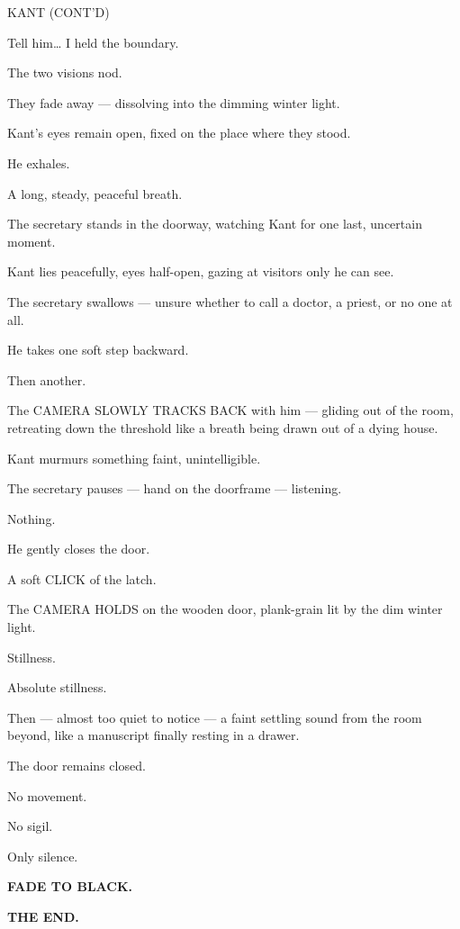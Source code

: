 \documentclass[12pt]{article}
\newenvironment{dialogue}[1]{%
  \vspace{0.8\baselineskip}%
  \noindent\hspace*{2.3in}\textsc{#1}\par%
  \noindent\hspace*{1.5in}\begin{minipage}[t]{4.5in}%
}{%
  \end{minipage}\par%
}
\newcommand{\transition}[1]{%
  \vspace{0.6\baselineskip}%
  \begin{flushright}\textbf{#1}\end{flushright}%
}
\begin{document}
\begin{dialogue}{KANT (CONT'D)}
Tell him…
I held the boundary.
\end{dialogue}

The two visions nod.

They fade away — dissolving into the dimming winter light.

Kant’s eyes remain open, fixed on the place where they stood.

He exhales.

A long, steady, peaceful breath.

The secretary stands in the doorway, watching Kant for one last, uncertain moment.

Kant lies peacefully, eyes half-open, gazing at visitors only he can see.

The secretary swallows — unsure whether to call a doctor, a priest, or no one at all.

He takes one soft step backward.

Then another.

The CAMERA SLOWLY TRACKS BACK with him — gliding out of the room, retreating down the threshold like a breath being drawn out of a dying house.

Kant murmurs something faint, unintelligible.

The secretary pauses — hand on the doorframe — listening.

Nothing.

He gently closes the door.

A soft CLICK of the latch.

The CAMERA HOLDS on the wooden door, plank-grain lit by the dim winter light.

Stillness.

Absolute stillness.

Then — almost too quiet to notice — a faint settling sound from the room beyond, like a manuscript finally resting in a drawer.

The door remains closed.

No movement.

No sigil.

Only silence.

\transition{FADE TO BLACK.}

\transition{THE END.}
\end{document}
